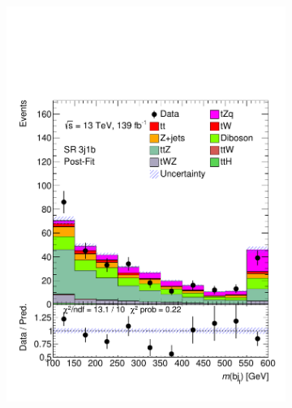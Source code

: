 \begin{figure}[!h]
\begin{subfigure}[b]{0.33\linewidth}
    \includegraphics[width=\textwidth]{ubonn-thesis/Chapters/Chapters_08/appendix/data/SR_3j1b_postFit.pdf} 
  \end{subfigure}%
  \begin{subfigure}[b]{0.33\linewidth}
    \centering

\end{subfigure}
\end{figure}
